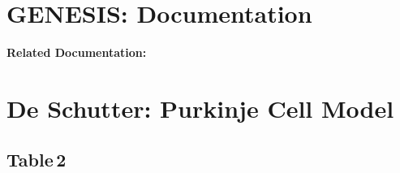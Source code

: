 \documentclass[12pt]{article}
\begin{document}
\section*{GENESIS: Documentation}

{\bf Related Documentation:}

\section*{De Schutter: Purkinje Cell Model}

\subsection*{Table\,2}
\end{document}

